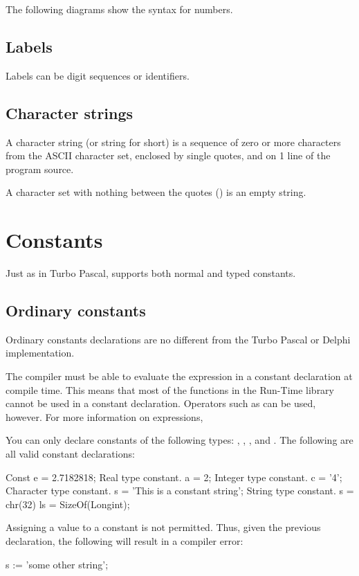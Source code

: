 \documentclass{report}
\begin{document}
The following diagrams show the syntax for numbers.



\section{Labels}

Labels can be digit sequences or identifiers. 


 
\section{Character strings}
A character string (or string for short) is a sequence of zero or more
characters from the ASCII character set, enclosed by single quotes, and on 1
line of the program source.

A character set with nothing between the quotes () is an empty 
string.



\chapter{Constants}

Just as in Turbo Pascal, \fpc supports both normal and typed constants.

\section{Ordinary constants}

Ordinary constants declarations are no different from the Turbo Pascal or
Delphi  implementation.

The compiler must be able to evaluate the expression in a constant
declaration at compile time.  This means that most of the functions
in the Run-Time library cannot be used in a constant declaration.
Operators such as  can be used, however. For more information on expressions,

You can only declare constants of the following types: ,
, , and . 
The following are all valid constant declarations:
\begin{listing}
Const
  e = 2.7182818;  { Real type constant. }
  a = 2;          { Integer type constant. }
  c = '4';        { Character type constant. }
  s = 'This is a constant string'; {String type constant.}
  s = chr(32)
  ls = SizeOf(Longint);
\end{listing}
Assigning a value to a constant is not permitted. Thus, given the previous
declaration, the following will result in a compiler error:
\begin{listing}
  s := 'some other string';
\end{listing}
\end{document}
